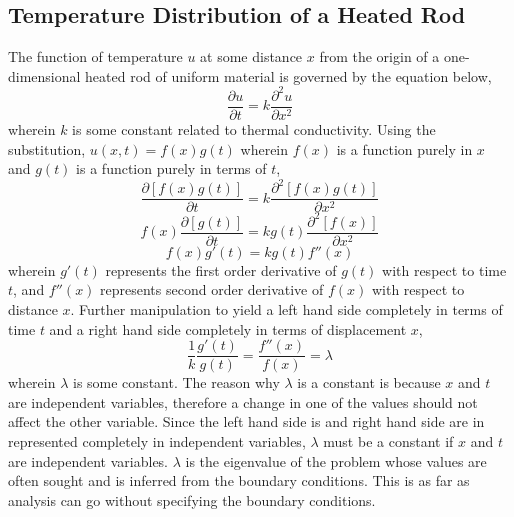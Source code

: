 \documentclass[a4paper, 12pt]{report}
\def\la{\lambda}
\def\f{\frac}
\def\p{\partial}
\let\stdsection\section
\renewcommand\section{\newpage\stdsection}
\begin{document}
\begin{center}
\section{Temperature Distribution of a Heated Rod}
\begin{comment}
Havent inserted Sturm Liouville orthonormal basis functions
\end{comment}
The function of temperature $u$ at some distance $x$ from the origin of a one-dimensional heated rod of uniform material is governed by the equation below,
$$\f{\p u}{\p t} = k\f{\p^2 u}{\p x^2}$$
wherein $k$ is some constant related to thermal conductivity. Using the substitution, $u(x,t) = f(x)g(t)$ wherein $f(x)$ is a function purely in $x$ and $g(t)$ is a function purely in terms of $t$,
$$\f{\p [f(x)g(t)]}{\p t} = k\f{\p^2 [f(x)g(t)]}{\p x^2}$$
$$f(x)\f{\p [g(t)]}{\p t} = kg(t)\f{\p^2 [f(x)]}{\p x^2}$$
$$f(x)g'(t) = kg(t)f''(x)$$
wherein $g'(t)$ represents the first order derivative of $g(t)$ with respect to time $t$, and $f''(x)$ represents second order derivative of $f(x)$ with respect to distance $x$. Further manipulation to yield a left hand side completely in terms of time $t$ and a right hand side completely in terms of displacement $x$,
$$\f{1}{k}\f{g'(t)}{g(t)} = \f{f''(x)}{f(x)} = \lambda$$
wherein $\lambda$ is some constant. The reason why $\lambda$ is a constant is because $x$ and $t$ are independent variables, therefore a change in one of the values should not affect the other variable. Since the left hand side is and right hand side are in represented completely in independent variables, $\lambda$ must be a constant if $x$ and $t$ are independent variables. $\la$ is the eigenvalue of the problem whose values are often sought and is inferred from the boundary conditions. This is as far as analysis can go without specifying the boundary conditions.

\end{center}
\end{document}
